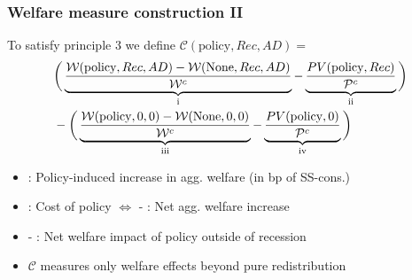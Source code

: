 \documentclass[pdflatex,aspectratio=169]{beamer}
\newcommand{\RNum}[1]{\uppercase\expandafter{\romannumeral #1\relax}}
\begin{document}
\begin{frame}
	\frametitle{Welfare measure construction II}
	\hypertarget{WelfareMeasure1}{}
	
	
	To satisfy principle 3 we define $\mathcal{C}(\text{policy},Rec,AD) =$
	\begin{align*}
		& \bigg( \underbrace{\frac{\mathcal{W}(\text{policy},Rec,AD)-\mathcal{W}(\text{None},Rec,AD)}{\mathcal{W}^c}}_\text{\RNum{1}}  - \underbrace{\frac{PV(\text{policy},Rec)}{\mathcal{P}^c} }_\text{\RNum{2}} \bigg) \nonumber \\  
		& -
		\bigg( \underbrace{\frac{\mathcal{W}(\text{policy},0,0) - \mathcal{W}(\text{None},0,0)}{\mathcal{W}^c}}_\text{\RNum{3}}  - \underbrace{\frac{PV(\text{policy},0)}{\mathcal{P}^c}}_\text{\RNum{4}}  \bigg) 
	\end{align*}
	
	\begin{itemize}[<+->]
		\item \RNum{1}: Policy-induced increase in agg. welfare (in bp of SS-cons.)
		\item \RNum{2}: Cost of policy $\Leftrightarrow$ \RNum{1} - \RNum{2}: Net agg. welfare increase
		\item \RNum{3} - \RNum{4}: Net welfare impact of policy outside of recession
		\item $\mathcal{C}$ measures only welfare effects beyond pure redistribution
	\end{itemize}
	
\end{frame}
	
\end{document}
